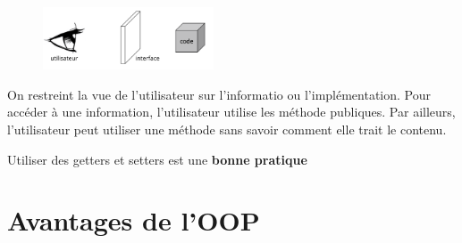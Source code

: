 \documentclass[16pt]{report}
\begin{document}
\begin{multicols*}{2}
        \begin{figure}[H]
            \begin{center}
                \includegraphics[width=0.45\textwidth]{SpaguettiCode.png}
            \end{center}
        \end{figure}
        On restreint la vue de l'utilisateur sur l'informatio ou l'implémentation. 
        Pour accéder à une information, l'utilisateur utilise les méthode publiques. 
        Par ailleurs, l'utilisateur peut utiliser une méthode sans savoir comment elle trait le contenu. 

        \begin{note}{}{}
            Utiliser des getters et setters est une \textbf{bonne pratique}  
        \end{note}
        

        \section{Avantages de l'OOP}


\end{multicols*}
\end{document}
